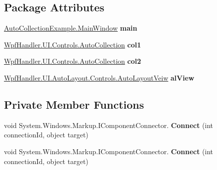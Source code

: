 \subsection*{Package Attributes}
\begin{DoxyCompactItemize}
\item 
\mbox{\label{class_auto_collection_example_1_1_main_window_affb7a39147ac97960858d951de9d4de6}} 
\mbox{\hyperlink{class_auto_collection_example_1_1_main_window}{Auto\+Collection\+Example.\+Main\+Window}} {\bfseries main}
\item 
\mbox{\label{class_auto_collection_example_1_1_main_window_a152b5e9b0d5af5371fc393fc92c299c3}} 
\mbox{\hyperlink{class_wpf_handler_1_1_u_i_1_1_controls_1_1_auto_collection}{Wpf\+Handler.\+U\+I.\+Controls.\+Auto\+Collection}} {\bfseries col1}
\item 
\mbox{\label{class_auto_collection_example_1_1_main_window_a48f3676a48f8720689577f172b57ca84}} 
\mbox{\hyperlink{class_wpf_handler_1_1_u_i_1_1_controls_1_1_auto_collection}{Wpf\+Handler.\+U\+I.\+Controls.\+Auto\+Collection}} {\bfseries col2}
\item 
\mbox{\label{class_auto_collection_example_1_1_main_window_a766ace10dd40725376029b40290d176b}} 
\mbox{\hyperlink{class_wpf_handler_1_1_u_i_1_1_auto_layout_1_1_controls_1_1_auto_layout_veiw}{Wpf\+Handler.\+U\+I.\+Auto\+Layout.\+Controls.\+Auto\+Layout\+Veiw}} {\bfseries al\+View}
\end{DoxyCompactItemize}
\subsection*{Private Member Functions}
\begin{DoxyCompactItemize}
\item 
\mbox{\label{class_auto_collection_example_1_1_main_window_acbb1f20fafcd9d4dbc0da22ec092fa7f}} 
void System.\+Windows.\+Markup.\+I\+Component\+Connector. {\bfseries Connect} (int connection\+Id, object target)
\item 
\mbox{\label{class_auto_collection_example_1_1_main_window_acbb1f20fafcd9d4dbc0da22ec092fa7f}} 
void System.\+Windows.\+Markup.\+I\+Component\+Connector. {\bfseries Connect} (int connection\+Id, object target)
\end{DoxyCompactItemize}
